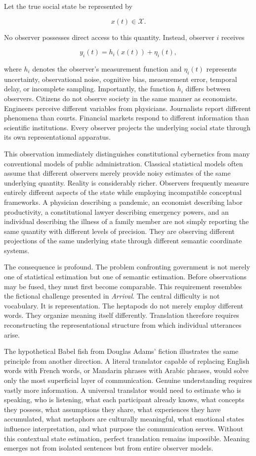 \documentclass[12pt,a4paper]{article}
\begin{document}
Let the true social state be represented by

\[
x(t)\in\mathcal{X}.
\]

No observer possesses direct access to this quantity. Instead, observer \(i\) receives

\[
y_i(t)
=
h_i(x(t))
+
\eta_i(t),
\]

where \(h_i\) denotes the observer's measurement function and \(\eta_i(t)\) represents uncertainty, observational noise, cognitive bias, measurement error, temporal delay, or incomplete sampling. Importantly, the function \(h_i\) differs between observers. Citizens do not observe society in the same manner as economists. Engineers perceive different variables from physicians. Journalists report different phenomena than courts. Financial markets respond to different information than scientific institutions. Every observer projects the underlying social state through its own representational apparatus.

This observation immediately distinguishes constitutional cybernetics from many conventional models of public administration. Classical statistical models often assume that different observers merely provide noisy estimates of the same underlying quantity. Reality is considerably richer. Observers frequently measure entirely different aspects of the state while employing incompatible conceptual frameworks. A physician describing a pandemic, an economist describing labor productivity, a constitutional lawyer describing emergency powers, and an individual describing the illness of a family member are not simply reporting the same quantity with different levels of precision. They are observing different projections of the same underlying state through different semantic coordinate systems.

The consequence is profound. The problem confronting government is not merely one of statistical estimation but one of semantic estimation. Before observations may be fused, they must first become comparable. This requirement resembles the fictional challenge presented in \emph{Arrival}. The central difficulty is not vocabulary. It is representation. The heptapods do not merely employ different words. They organize meaning itself differently. Translation therefore requires reconstructing the representational structure from which individual utterances arise.

The hypothetical Babel fish from Douglas Adams' fiction illustrates the same principle from another direction. A literal translator capable of replacing English words with French words, or Mandarin phrases with Arabic phrases, would solve only the most superficial layer of communication. Genuine understanding requires vastly more information. A universal translator would need to estimate who is speaking, who is listening, what each participant already knows, what concepts they possess, what assumptions they share, what experiences they have accumulated, what metaphors are culturally meaningful, what emotional states influence interpretation, and what purpose the communication serves. Without this contextual state estimation, perfect translation remains impossible. Meaning emerges not from isolated sentences but from entire observer models.
\end{document}
